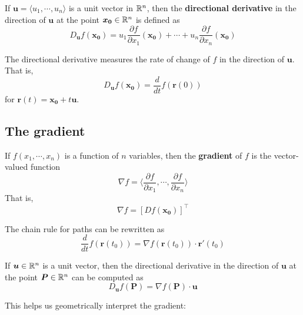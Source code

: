 \begin{definition}
    If $\bm{u} = \langle u_1, \cdots, u_n \rangle$ is a unit vector in $\mathbb{R}^n$, then the \textbf{directional derivative}
    in the direction of $\bm{u}$ at the point $\bm{x_0} \in \mathbb{R}^n$ is defined as
    $$D_{\bm{u}} f(\bm{x_0}) = u_1\frac{\partial f}{\partial x_1}(\bm{x_0}) + \cdots + u_n\frac{\partial f}{\partial x_n}(\bm{x_0})$$
    \end{definition}

The directional derivative measures the rate of change of $f$ in the direction of $\bm{u}$.  That is, $$D_{\bm{u}} f(\bm{x_0}) = \frac{d}{dt}f(\bm{r}(0))$$ for $\bm{r}(t) = \bm{x_0} + t\bm{u}$.


\begin{example}
    
\end{example}



\subsection{The gradient}


\begin{definition}
    If $f(x_1,\cdots,x_n)$ is a function of $n$ variables, then the \textbf{gradient} of $f$ is the vector-valued function 
    $$\nabla f = \langle \frac{\partial f}{\partial x_1} , \cdots, \frac{\partial f}{\partial x_n} \rangle$$
    That is, $$\nabla f = [Df(\bm{x_0})]^\top$$
    \end{definition}


    
    \begin{proposition}
    The chain rule for paths can be rewritten as
    $$\frac{d}{dt}f(\bm{r}(t_0))= \nabla f(\bm{r}(t_0)) \cdot \bm{r}'(t_0)$$
    
    \end{proposition}

 \begin{corollary}
     If $\bm{u} \in \mathbb{R}^n$ is a unit vector, then the directional derivative
    in the direction of $\bm{u}$ at the point $\bm{P} \in \mathbb{R}^n$ can be computed as
    $$D_{\bm{u}} f(\bm{P}) = \nabla f(\bm{P}) \cdot \bm{u}$$
 \end{corollary}
        
This helps us geometrically interpret the gradient:

